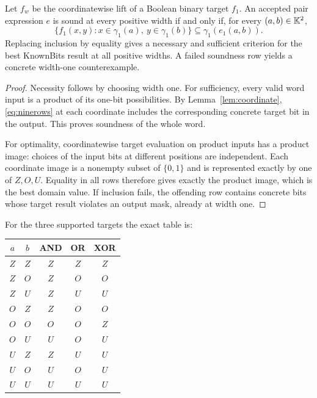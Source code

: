 \begin{theorem}\label{thm:ninerows}
Let $f_w$ be the coordinatewise lift of a Boolean binary target $f_1$. An accepted pair expression $e$ is sound at every positive width if and only if, for every $(a,b)\in\mathbb K^2$,
\begin{equation}\label{eq:ninerows}
\{f_1(x,y):x\in\gamma_1(a),\ y\in\gamma_1(b)\}
\subseteq\gamma_1(e_1(a,b)).
\end{equation}
Replacing inclusion by equality gives a necessary and sufficient criterion for the best KnownBits result at all positive widths. A failed soundness row yields a concrete width-one counterexample.
\end{theorem}
\begin{proof}
Necessity follows by choosing width one. For sufficiency, every valid word input is a product of its one-bit possibilities. By Lemma~\ref{lem:coordinate}, \eqref{eq:ninerows} at each coordinate includes the corresponding concrete target bit in the output. This proves soundness of the whole word.

For optimality, coordinatewise target evaluation on product inputs has a product image: choices of the input bits at different positions are independent. Each coordinate image is a nonempty subset of $\{0,1\}$ and is represented exactly by one of $Z,O,U$. Equality in all rows therefore gives exactly the product image, which is the best domain value. If inclusion fails, the offending row contains concrete bits whose target result violates an output mask, already at width one.
\end{proof}

For the three supported targets the exact table is:
\begin{center}
\begin{tabular}{@{}ccccc@{}}
\toprule
$a$&$b$&AND&OR&XOR\\\midrule
$Z$&$Z$&$Z$&$Z$&$Z$\\
$Z$&$O$&$Z$&$O$&$O$\\
$Z$&$U$&$Z$&$U$&$U$\\
$O$&$Z$&$Z$&$O$&$O$\\
$O$&$O$&$O$&$O$&$Z$\\
$O$&$U$&$U$&$O$&$U$\\
$U$&$Z$&$Z$&$U$&$U$\\
$U$&$O$&$U$&$O$&$U$\\
$U$&$U$&$U$&$U$&$U$\\\bottomrule
\end{tabular}
\end{center}

